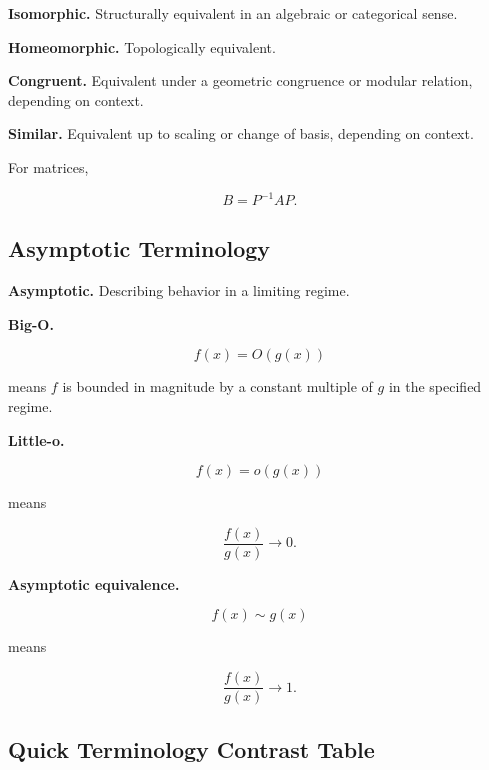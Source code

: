 \medskip

\textbf{Isomorphic.}
Structurally equivalent in an algebraic or categorical sense.

\medskip

\textbf{Homeomorphic.}
Topologically equivalent.

\medskip

\textbf{Congruent.}
Equivalent under a geometric congruence or modular relation, depending on
context.

\medskip

\textbf{Similar.}
Equivalent up to scaling or change of basis, depending on context.

For matrices,

\[
\boxed{
B=P^{-1}AP.
}
\]

\subsection{Asymptotic Terminology}
\label{subsec:asymptotic-terminology-reference}

\textbf{Asymptotic.}
Describing behavior in a limiting regime.

\medskip

\textbf{Big-O.}

\[
\boxed{
f(x)=O(g(x))
}
\]

means \(f\) is bounded in magnitude by a constant multiple of \(g\) in the
specified regime.

\medskip

\textbf{Little-o.}

\[
\boxed{
f(x)=o(g(x))
}
\]

means

\[
\boxed{
\frac{f(x)}{g(x)}
\to0.
}
\]

\medskip

\textbf{Asymptotic equivalence.}

\[
\boxed{
f(x)\sim g(x)
}
\]

means

\[
\boxed{
\frac{f(x)}{g(x)}
\to1.
}
\]

\subsection{Quick Terminology Contrast Table}
\label{subsec:quick-terminology-contrast}

